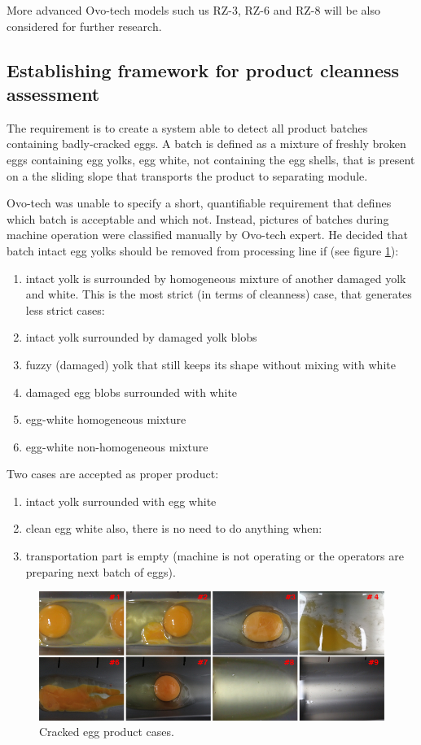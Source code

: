 \documentclass[12pt,twoside,a4paper]{article}
\begin{document}
More advanced Ovo-tech models such us RZ-3, RZ-6 and RZ-8 will be also considered for further research.


\subsection{Establishing framework for product cleanness assessment}

The requirement is to create a system able to detect all product batches containing badly-cracked eggs.
A batch is defined as a mixture of freshly broken eggs containing egg yolks, egg white, not containing the egg shells, that is present on a the sliding slope that transports the product to separating module.

Ovo-tech was unable to specify a short, quantifiable requirement that defines which batch is acceptable and which not. Instead, pictures of batches during machine operation were classified manually by Ovo-tech expert. He decided that batch intact egg yolks should be removed from processing line if (see figure \ref{fig:8of9}):

\begin{enumerate}
\item intact yolk is surrounded by homogeneous mixture of another damaged yolk and white.
This is the most strict (in terms of cleanness) case, that generates less strict cases:
\item intact yolk surrounded by damaged yolk blobs
\item fuzzy (damaged) yolk that still keeps its shape without mixing with white
\item damaged egg blobs surrounded with white
\item egg-white homogeneous mixture
\item egg-white non-homogeneous mixture
\end{enumerate}
Two cases are accepted as proper product:
\begin{enumerate}[resume]
\item intact yolk surrounded with egg white
\item clean egg white
also, there is no need to do anything when:
\item transportation part is empty (machine is not operating or the operators are preparing next batch of eggs).
\end{enumerate}

 

\begin{figure}[H]
\centering
\includegraphics[width=0.8\paperwidth]{8of9}
\caption{Cracked egg product cases.}\label{fig:8of9}
\end{figure}
\end{document}
